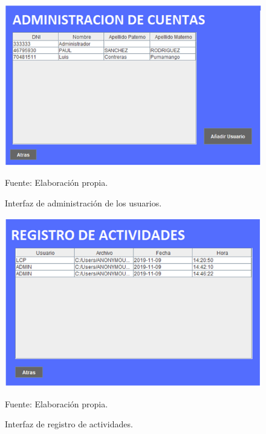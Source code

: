 \begin{figure}[h!]
	\centering
		\includegraphics[scale=0.6]{imagenes/admincuentas.png}
		\caption{Interfaz de administración de los usuarios.}
		\begin{center}
    Fuente: Elaboración propia.
    \end{center}
	\label{fig:admincuentas}
\end{figure}

\begin{figure}[h!]
	\centering
		\includegraphics[scale=0.6]{imagenes/regActividades.png}
		\caption{Interfaz de registro de actividades.}
		\begin{center}
    Fuente: Elaboración propia.
    \end{center}
	\label{fig:regActividades}
\end{figure}

